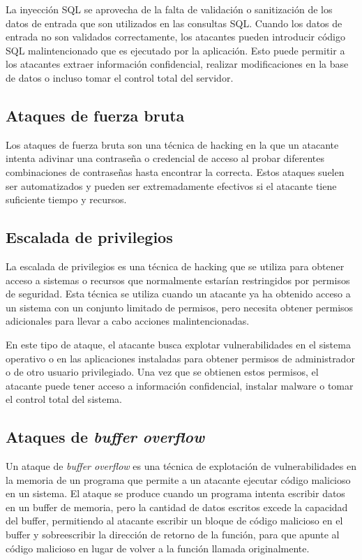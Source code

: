             La inyección SQL se aprovecha de la falta de validación o sanitización de los datos de entrada que son utilizados en las consultas SQL. Cuando los datos de entrada no son validados correctamente, los atacantes pueden introducir código SQL malintencionado que es ejecutado por la aplicación. Esto puede permitir a los atacantes extraer información confidencial, realizar modificaciones en la base de datos o incluso tomar el control total del servidor.
        
        
        \subsection{Ataques de fuerza bruta}
            
            Los ataques de fuerza bruta son una técnica de hacking en la que un atacante intenta adivinar una contraseña o credencial de acceso al probar diferentes combinaciones de contraseñas hasta encontrar la correcta. Estos ataques suelen ser automatizados y pueden ser extremadamente efectivos si el atacante tiene suficiente tiempo y recursos.
        
        
        \subsection{Escalada de privilegios}
            
            La escalada de privilegios es una técnica de hacking que se utiliza para obtener acceso a sistemas o recursos que normalmente estarían restringidos por permisos de seguridad. Esta técnica se utiliza cuando un atacante ya ha obtenido acceso a un sistema con un conjunto limitado de permisos, pero necesita obtener permisos adicionales para llevar a cabo acciones malintencionadas.
            
            En este tipo de ataque, el atacante busca explotar vulnerabilidades en el sistema operativo o en las aplicaciones instaladas para obtener permisos de administrador o de otro usuario privilegiado. Una vez que se obtienen estos permisos, el atacante puede tener acceso a información confidencial, instalar malware o tomar el control total del sistema.
        
        
        \subsection{Ataques de \textit{buffer overflow}}
            
            Un ataque de \textit{buffer overflow} es una técnica de explotación de vulnerabilidades en la memoria de un programa que permite a un atacante ejecutar código malicioso en un sistema. El ataque se produce cuando un programa intenta escribir datos en un buffer de memoria, pero la cantidad de datos escritos excede la capacidad del buffer, permitiendo al atacante escribir un bloque de código malicioso en el buffer y sobreescribir la dirección de retorno de la función, para que apunte al código malicioso en lugar de volver a la función llamada originalmente.
            
